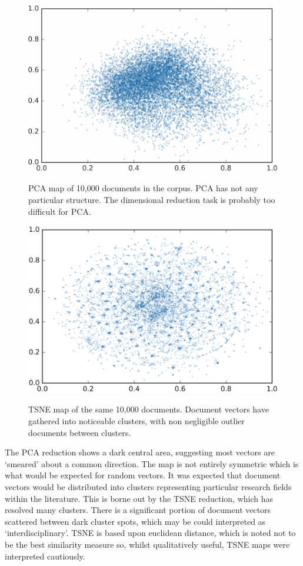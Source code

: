 \begin{figure}[H]
  \centering
  \begin{minipage}[b]{0.49\textwidth}
  \label{fig:PCA_snap}
    \includegraphics[width=\textwidth]{Validation/pca2.png}
    \caption{PCA map of 10,000 documents in the corpus. PCA has not any particular structure. The dimensional reduction task is probably too difficult for PCA.}
  \end{minipage}
  \hfill
  \begin{minipage}[b]{0.49\textwidth}
  \label{fig:TSNE_snap}
    \includegraphics[width=\textwidth]{Validation/tsne2.png}
    \caption{TSNE map of the same 10,000 documents. Document vectors have gathered into noticeable clusters, with non negligible outlier documents between clusters. }
  \end{minipage}
\end{figure}
The PCA reduction shows a dark central area, suggesting most vectors are `smeared' about a common direction. The map is not entirely symmetric which is what would be expected for random vectors. It was expected that document vectors would be distributed into clusters representing particular research fields within the literature. This is borne out by the TSNE reduction, which has resolved many clusters. There is a significant portion of document vectors scattered between dark cluster spots, which may be could interpreted as `interdisciplinary'.
TSNE is based upon euclidean distance, which is noted not to be the best similarity measure so, whilst qualitatively useful, TSNE maps were interpreted cautiously.
